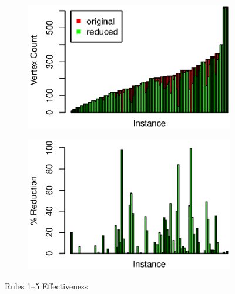 \documentclass{article}
\theoremstyle{definition}
\begin{document}
\begin{figure}[h]
	\begin{subfigure}{0.49\textwidth}
		\includegraphics[width=1.0\linewidth]{rules1-5_absolute}
	\end{subfigure}
	\begin{subfigure}{0.49\textwidth}
		\includegraphics[width=1.0\linewidth]{rules1-5_percent}
	\end{subfigure}
	\caption{Rules 1--5 Effectiveness}
	\label{fig:rules1-5 eff}
\end{figure}
\end{document}
